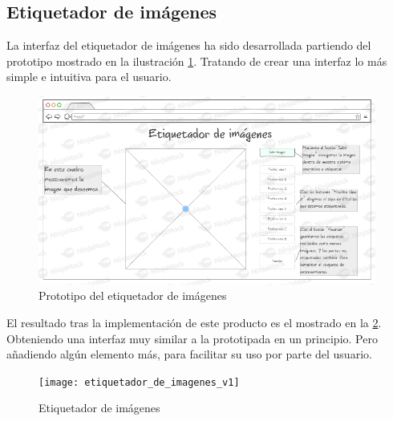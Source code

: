 \subsection{Etiquetador de imágenes}

La interfaz del etiquetador de imágenes ha sido desarrollada partiendo del prototipo mostrado en la ilustración \ref{fig:C.5.2}. Tratando de crear una interfaz lo más simple e intuitiva para el usuario.

\begin{figure}[h]
\centering
\includegraphics[width=0.99\textwidth]{protototipo_etiquetador_de_imagenes}
\caption{Prototipo del etiquetador de imágenes}
\label{fig:C.5.2}
\end{figure}

El resultado tras la implementación de este producto es el mostrado en la \ref{fig:C.5.3}. Obteniendo una interfaz muy similar a la prototipada en un principio. Pero añadiendo algún elemento más, para facilitar su uso por parte del usuario.

\begin{figure}[h]
\centering
\texttt{[image: etiquetador\_de\_imagenes\_v1]}
\caption{Etiquetador de imágenes}
\label{fig:C.5.3}
\end{figure}